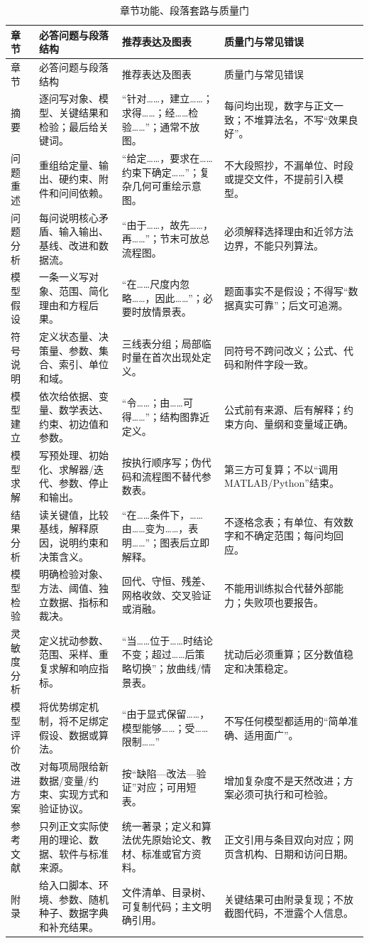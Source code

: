 \documentclass[UTF8,a4paper,12pt]{ctexart}
\begin{document}
{\begin{longtable}{p{1.8cm}p{4.2cm}p{4.0cm}p{4.0cm}}
\caption{章节功能、段落套路与质量门}\label{tab:sections}\\
\toprule
章节 & 必答问题与段落结构 & 推荐表达及图表 & 质量门与常见错误\\
\midrule
\endfirsthead
\toprule
章节 & 必答问题与段落结构 & 推荐表达及图表 & 质量门与常见错误\\
\midrule
\endhead
摘要 & 逐问写对象、模型、关键结果和检验；最后给关键词。 & “针对……，建立……；求得……；经……检验……”；通常不放图。 & 每问均出现，数字与正文一致；不堆算法名，不写“效果良好”。\\
问题重述 & 重组给定量、输出、硬约束、附件和问间依赖。 & “给定……，要求在……约束下确定……”；复杂几何可重绘示意图。 & 不大段照抄，不漏单位、时段或提交文件，不提前引入模型。\\
问题分析 & 每问说明核心矛盾、输入输出、基线、改进和数据流。 & “由于……，故先……，再……”；节末可放总流程图。 & 必须解释选择理由和近邻方法边界，不能只列算法。\\
模型假设 & 一条一义写对象、范围、简化理由和方程后果。 & “在……尺度内忽略……，因此……”；必要时放情景表。 & 题面事实不是假设；不得写“数据真实可靠”；后文可追溯。\\
符号说明 & 定义状态量、决策量、参数、集合、索引、单位和域。 & 三线表分组；局部临时量在首次出现处定义。 & 同符号不跨问改义；公式、代码和附件字段一致。\\
模型建立 & 依次给依据、变量、数学表达、约束、初边值和参数。 & “令……；由……可得……”；结构图靠近定义。 & 公式前有来源、后有解释；约束方向、量纲和变量域正确。\\
模型求解 & 写预处理、初始化、求解器/迭代、参数、停止和输出。 & 按执行顺序写；伪代码和流程图不替代参数表。 & 第三方可复算；不以“调用 MATLAB/Python”结束。\\
结果分析 & 读关键值，比较基线，解释原因，说明约束和决策含义。 & “在……条件下，……由……变为……，表明……”；图表后立即解释。 & 不逐格念表；有单位、有效数字和不确定范围；每问均回应。\\
模型检验 & 明确检验对象、方法、阈值、独立数据、指标和裁决。 & 回代、守恒、残差、网格收敛、交叉验证或消融。 & 不能用训练拟合代替外部能力；失败项也要报告。\\
灵敏度分析 & 定义扰动参数、范围、采样、重复求解和响应指标。 & “当……位于……时结论不变；超过……后策略切换”；放曲线/情景表。 & 扰动后必须重算；区分数值稳定和决策稳定。\\
模型评价 & 将优势绑定机制，将不足绑定假设、数据或算法。 & “由于显式保留……，模型能够……；受……限制……” & 不写任何模型都适用的“简单准确、适用面广”。\\
改进方案 & 对每项局限给新数据/变量/约束、实现方式和验证协议。 & 按“缺陷—改法—验证”对应；可用短表。 & 增加复杂度不是天然改进；方案必须可执行和可检验。\\
参考文献 & 只列正文实际使用的理论、数据、软件与标准来源。 & 统一著录；定义和算法优先原始论文、教材、标准或官方资料。 & 正文引用与条目双向对应；网页含机构、日期和访问日期。\\
附录 & 给入口脚本、环境、参数、随机种子、数据字典和补充结果。 & 文件清单、目录树、可复制代码；主文明确引用。 & 关键结果可由附录复现；不放截图代码，不泄露个人信息。\\
\bottomrule
\end{longtable}

}
\end{document}
